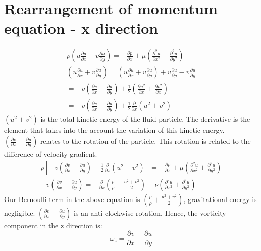 \documentclass[class=report, crop=false, 12pt,a4paper]{standalone}
\begin{document}
\section{Rearrangement of momentum equation - x direction}
\begin{gather}
  \rho \left( u \frac{\partial u}{\partial x} + v\frac{\partial u}{\partial y} \right) = -\frac{\partial p}{\partial x}  + \mu \left( \frac{\partial^2 u}{\partial x^2} + \frac{\partial^2 u}{\partial y^2} \right)\\
  \left(u \frac{\partial u}{\partial x} + v \frac{\partial u}{\partial y} \right) = \left(u \frac{\partial u}{\partial x} + v \frac{\partial u}{\partial y} \right) + v \frac{\partial u}{\partial y} - v \frac{\partial u}{\partial y}\\
  = - v \left(\frac{\partial v}{\partial x} - \frac{\partial u}{\partial y} \right) + \frac{1}{2} \left( \frac{\partial u^2}{\partial x} + \frac{\partial v^2}{\partial x} \right)\\
  = - v \left( \frac{\partial v}{\partial x} - \frac{\partial u}{\partial y} \right) + \frac{1}{2} \frac{\partial}{\partial x} (u^2 + v^2)
\end{gather}
$(u^2 + v^2)$ is the total kinetic energy of the fluid particle. The derivative is the element that takes into the account the variation of this kinetic energy. $\left( \frac{\partial v}{\partial x} - \frac{\partial u}{\partial y} \right)$ relates to the rotation of the particle. This rotation is related to the difference of velocity gradient.
\begin{gather}
  \rho \left[ -v \left( \frac{\partial v}{\partial x} - \frac{\partial u}{\partial y} \right) + \frac{1}{2} \frac{\partial}{\partial x} (u^2 + v^2) \right] = - \frac{\partial p}{\partial x} + \mu \left( \frac{\partial^2 u}{\partial x^2} + \frac{\partial^2 u}{\partial y^2} \right)\\
  - v \left( \frac{\partial v}{\partial x} - \frac{\partial u}{\partial y} \right) = - \frac{\partial}{\partial x} \left( \frac{p}{\rho} + \frac{u^2 + v^2}{2} \right) + \nu \left( \frac{\partial^2 u}{\partial x^2} + \frac{\partial^2 u}{\partial y^2} \right)   
\end{gather}
Our Bernoulli term in the above equation is $\left( \frac{p}{\rho} + \frac{u^2 + v^2}{2} \right)$, gravitational energy is negligible. $\left( \frac{\partial v}{\partial x} - \frac{\partial u}{\partial y} \right)$ is an anti-clockwise rotation. Hence, the vorticity component in the z direction is:
\begin{equation}
  \omega_z = \frac{\partial v}{\partial x} - \frac{\partial u}{\partial y}
\end{equation}
\end{document}
